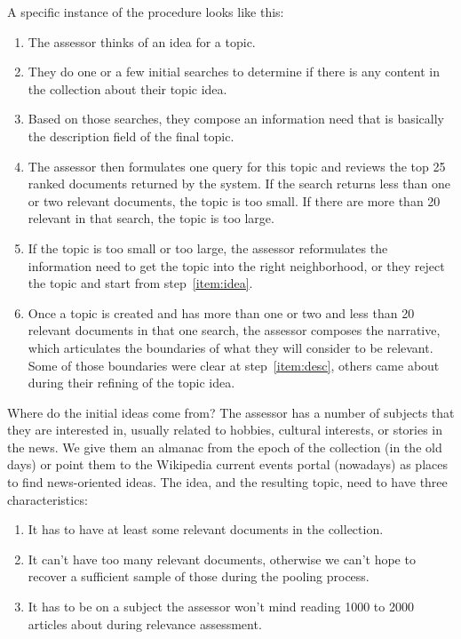 \documentclass[nobib]{tufte-book}
\begin{document}
A specific instance of the procedure looks like this:
\begin{enumerate}
    \item \label{item:idea} The assessor thinks of an idea for a topic.
    \item They do one or a few initial searches to determine if there is any content in the collection about their topic idea.
    \item \label{item:desc} Based on those searches, they compose an information need that is basically the description field of the final topic.
    \item The assessor then formulates one query for this topic and reviews the top 25 ranked documents returned by the system.  If the search returns less than one or two relevant documents, the topic is too small.  If there are more than 20 relevant in that search, the topic is too large.
    \item If the topic is too small or too large, the assessor reformulates the information need to get the topic into the right neighborhood, or they reject the topic and start from step~\ref{item:idea}.
    \item Once a topic is created and has more than one or two and less than 20 relevant documents in that one search, the assessor composes the narrative, which articulates the boundaries of what they will consider to be relevant.  Some of those boundaries were clear at step~\ref{item:desc}, others came about during their refining of the topic idea.
\end{enumerate}

Where do the initial ideas come from?  The assessor has a number of subjects that they are interested in, usually related to hobbies, cultural interests, or stories in the news.  We give them an almanac from the epoch of the collection (in the old days) or point them to the Wikipedia current events portal (nowadays) as places to find news-oriented ideas.  The idea, and the resulting topic, need to have three characteristics:
\begin{enumerate}
    \item It has to have at least some relevant documents in the collection.
    \item It can't have too many relevant documents, otherwise we can't hope to recover a sufficient sample of those during the pooling process.
    \item It has to be on a subject the assessor won't mind reading 1000 to 2000 articles about during relevance assessment.
\end{enumerate}
\end{document}
